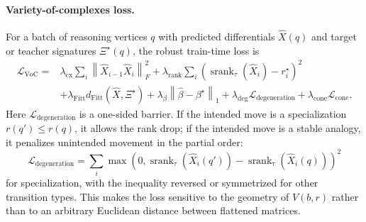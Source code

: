 \documentclass[11pt]{article}
\theoremstyle{definition}
\theoremstyle{plain}
\theoremstyle{remark}
\numberwithin{equation}{section}
\newcommand{\norm}[1]{\left\lVert #1\right\rVert}
\begin{document}
\paragraph{Variety-of-complexes loss.}
For a batch of reasoning vertices $q$ with predicted differentials $\widehat X(q)$ and target or teacher signatures $\Xi^\star(q)$, the robust train-time loss is
\begin{equation}
\begin{split}
  \mathcal L_{\mathrm{VoC}}
  ={}&
  \lambda_{\mathrm{cx}}\sum_i\norm{\widehat X_{i-1}\widehat X_i}_F^2
  +\lambda_{\mathrm{rank}}\sum_i
    \left(\operatorname{srank}_\tau(\widehat X_i)-r_i^\star\right)^2\\
  &+\lambda_{\mathrm{Fitt}}d_{\mathrm{Fitt}}(\widehat X,\Xi^\star)
  +\lambda_\beta\norm{\widehat\beta-\beta^\star}_1
  +\lambda_{\mathrm{deg}}\mathcal L_{\mathrm{degeneration}}
  +\lambda_{\mathrm{cone}}\mathcal L_{\mathrm{cone}} .
\end{split}
\end{equation}
Here $\mathcal L_{\mathrm{degeneration}}$ is a one-sided barrier.  If the intended move is a specialization $r(q')\leq r(q)$, it allows the rank drop; if the intended move is a stable analogy, it penalizes unintended movement in the partial order:
\begin{equation}
  \mathcal L_{\mathrm{degeneration}}
  =
  \sum_i
  \max(0,\operatorname{srank}_\tau(\widehat X_i(q'))-\operatorname{srank}_\tau(\widehat X_i(q)))^2
\end{equation}
for specialization, with the inequality reversed or symmetrized for other transition types.  This makes the loss sensitive to the geometry of $V(b,r)$ rather than to an arbitrary Euclidean distance between flattened matrices.
\end{document}

